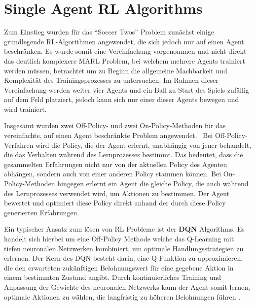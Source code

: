 \section{Single Agent RL Algorithms}

Zum Einstieg wurden für das ``Soccer Twos'' Problem zunächst einige grundlegende \ac{RL}-Algorithmen angewendet, die sich jedoch nur auf einen Agent beschränken. Es wurde somit eine Vereinfachung vorgenommen und nicht direkt das deutlich komplexere \ac{MARL} Problem, bei welchem mehrere Agents trainiert werden müssen, betrachtet um zu Beginn die allgemeine Machbarkeit und Komplexität des Trainingsprozesses zu untersuchen. Im Rahmen dieser Vereinfachung werden weiter vier Agents und ein Ball zu Start des Spiels zufällig auf dem Feld platziert, jedoch kann sich nur einer dieser Agents bewegen und wird trainiert. 

Insgesamt wurden zwei Off-Policy- und zwei On-Policy-Methoden für das vereinfachte, auf einen Agent beschränkte Problem angewendet. 
Bei Off-Policy-Verfahren wird die Policy, die der Agent erlernt, unabhängig von jener behandelt, die das Verhalten während des Lernprozesses bestimmt. Das bedeutet, dass die gesammelten Erfahrungen nicht nur von der aktuellen Policy des Agenten abhängen, sondern auch von einer anderen Policy stammen können.
Bei On-Policy-Methoden hingegen erlernt ein Agent die gleiche Policy, die auch während des Lernprozesses verwendet wird, um Aktionen zu bestimmen. Der Agent bewertet und optimiert diese Policy direkt anhand der durch diese Policy generierten Erfahrungen.

Ein typischer Ansatz zum lösen von \ac{RL} Probleme ist der \textbf{\ac{DQN}} Algorithms. Es handelt sich hierbei um eine Off-Policy Methode welche das Q-Learning mit tiefen neuronalen Netzwerken kombiniert, um optimale Handlungsstrategien zu erlernen. Der Kern des \ac{DQN} besteht darin, eine Q-Funktion zu approximieren, die den erwarteten zukünftigen Belohnungswert für eine gegebene Aktion in einem bestimmten Zustand angibt. %
Durch kontinuierliches Training und Anpassung der Gewichte des neuronalen Netzwerks kann der Agent somit lernen, optimale Aktionen zu wählen, die langfristig zu höheren Belohnungen führen \cite{mnih2013}. 

